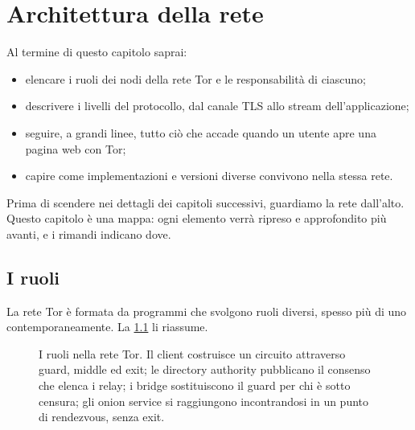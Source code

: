 \chapter{Architettura della rete}\label{cap:06-architettura}

\begin{obiettivi}
Al termine di questo capitolo saprai:
\begin{itemize}[nosep]
  \item elencare i ruoli dei nodi della rete Tor e le responsabilità di ciascuno;
  \item descrivere i livelli del protocollo, dal canale TLS allo stream dell'applicazione;
  \item seguire, a grandi linee, tutto ciò che accade quando un utente apre una pagina web con Tor;
  \item capire come implementazioni e versioni diverse convivono nella stessa rete.
\end{itemize}
\end{obiettivi}

Prima di scendere nei dettagli dei capitoli successivi, guardiamo la rete dall'alto. Questo capitolo è una mappa: ogni elemento verrà ripreso e approfondito più avanti, e i rimandi indicano dove.

\section{I ruoli}\label{sec:arch-ruoli}

La rete Tor è formata da programmi che svolgono ruoli diversi, spesso più di uno contemporaneamente. La \cref{fig:arch-ruoli} li riassume.

\begin{figure}[htbp]
\centering

\caption{I ruoli nella rete Tor. Il client costruisce un circuito attraverso guard, middle ed exit; le directory authority pubblicano il consenso che elenca i relay; i bridge sostituiscono il guard per chi è sotto censura; gli onion service si raggiungono incontrandosi in un punto di rendezvous, senza exit.}
\label{fig:arch-ruoli}
\end{figure}

